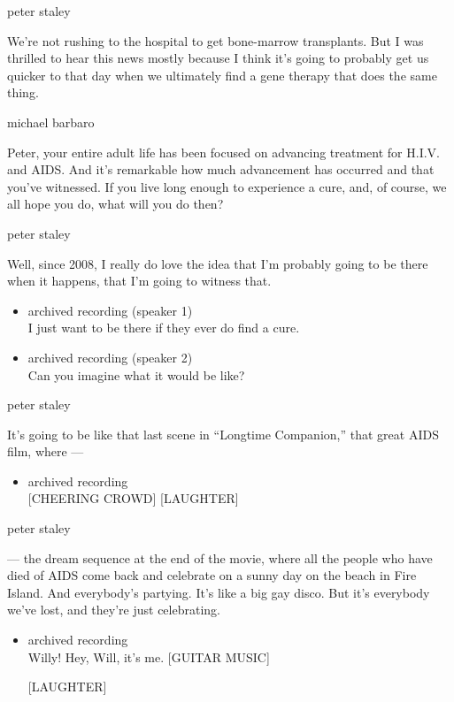 peter staley

We're not rushing to the hospital to get bone-marrow transplants. But I
was thrilled to hear this news mostly because I think it's going to
probably get us quicker to that day when we ultimately find a gene
therapy that does the same thing.

michael barbaro

Peter, your entire adult life has been focused on advancing treatment
for H.I.V. and AIDS. And it's remarkable how much advancement has
occurred and that you've witnessed. If you live long enough to
experience a cure, and, of course, we all hope you do, what will you do
then?

peter staley

Well, since 2008, I really do love the idea that I'm probably going to
be there when it happens, that I'm going to witness that.

\begin{itemize}
\item
  archived recording (speaker 1)\\
  I just want to be there if they ever do find a cure.
\item
  archived recording (speaker 2)\\
  Can you imagine what it would be like?
\end{itemize}

peter staley

It's going to be like that last scene in ``Longtime Companion,'' that
great AIDS film, where ---

\begin{itemize}
\tightlist
\item
  archived recording\\
  {[}CHEERING CROWD{]} {[}LAUGHTER{]}
\end{itemize}

peter staley

--- the dream sequence at the end of the movie, where all the people who
have died of AIDS come back and celebrate on a sunny day on the beach in
Fire Island. And everybody's partying. It's like a big gay disco. But
it's everybody we've lost, and they're just celebrating.

\begin{itemize}
\item
  archived recording\\
  Willy! Hey, Will, it's me. {[}GUITAR MUSIC{]}

  {[}LAUGHTER{]}
\end{itemize}

